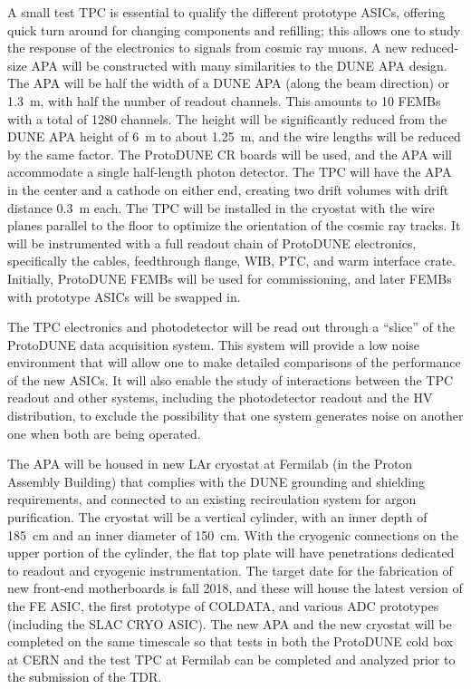 A small test TPC is essential to qualify the different prototype ASICs, offering quick turn around for changing components and refilling; this allows one to study the response of the electronics to signals from cosmic ray muons.  A new reduced-size APA will be constructed with many similarities to the DUNE APA design.  The APA will be half the width of a DUNE APA (along the beam direction) or 1.3~m, with half the number of readout channels.  This amounts to 10 FEMBs with a total of 1280 channels.  The height will be significantly reduced from the DUNE APA height of 6~m to about 1.25~m, and the wire lengths will be reduced by the same factor.  The ProtoDUNE CR boards will be used, and  the APA will accommodate a single half-length photon detector.  The TPC will have the APA in the center and a cathode on either end, creating two drift volumes with drift distance 0.3~m each.  The TPC will be installed in the cryostat with the wire planes parallel to the floor to optimize the orientation of the cosmic ray tracks.  It will be instrumented with a full readout chain of ProtoDUNE electronics, specifically  the cables, feedthrough flange, WIB, PTC, and warm interface crate.  Initially, ProtoDUNE FEMBs will be used for commissioning, and later FEMBs with prototype ASICs will be swapped in.

The TPC electronics and photodetector will be read out through a ``slice'' of the ProtoDUNE data acquisition system.  This system will provide a low noise environment that will allow one to make detailed comparisons of the performance of the new ASICs. It will also enable the study of interactions between the TPC readout and other systems, including the photodetector readout and the HV distribution, to exclude the possibility that one system generates noise on another one when both are being operated.
 
The APA will be housed in new LAr cryostat at Fermilab (in the Proton Assembly Building) that complies with the DUNE grounding and shielding requirements, and connected to an existing recirculation system for argon purification.  The cryostat will be a vertical cylinder, with an inner depth of 185~cm and an inner diameter of 150~cm.  With the cryogenic connections on the upper portion of the cylinder, the flat top plate will have penetrations dedicated to readout and cryogenic instrumentation.  The target date for the fabrication of new front-end motherboards is fall 2018, and these will house the latest version of the FE ASIC, the first prototype of COLDATA, and various ADC prototypes (including the SLAC CRYO ASIC).  The new APA and the new cryostat will be completed on the same timescale so that tests in both the ProtoDUNE cold box at CERN and the test TPC at Fermilab can be completed and analyzed prior to the submission of the TDR.  
